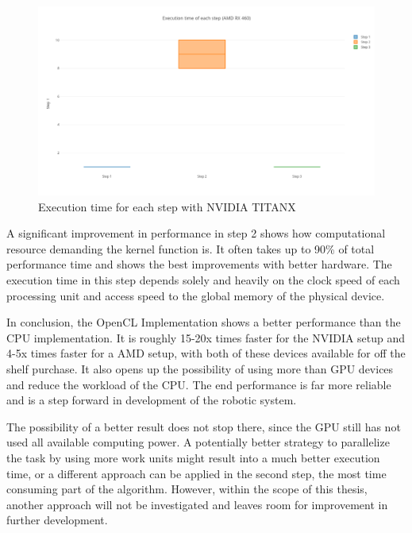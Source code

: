 \begin{figure}[H]
	\centering
	\includegraphics[width=14cm]{images/EachStepNVIDIA.png}
	\caption{Execution time for each step with NVIDIA TITANX}
	\label{ExampleOCTImage}
\end{figure}

A significant improvement in performance in step 2 shows how computational resource demanding the kernel function is. It often takes up to 90\% of total performance time and shows the best improvements with better hardware. The execution time in this step depends solely and heavily on the clock speed of each processing unit and access speed to the global memory of the physical device.

In conclusion, the OpenCL Implementation shows a better performance than the CPU implementation. It is roughly 15-20x times faster for the NVIDIA setup and 4-5x times faster for a AMD setup, with both of these devices available for off the shelf purchase. It also opens up the possibility of using more than GPU devices and reduce the workload of the CPU. The end performance is far more reliable and is a step forward in development of the robotic system. 

The possibility of a better result does not stop there, since the GPU still has not used all available computing power. A potentially better strategy to parallelize the task by using more work units might result into a much better execution time, or a different approach can be applied in the second step, the most time consuming part of the algorithm. However, within the scope of this thesis, another approach will not be investigated and leaves room for improvement in further development. 


